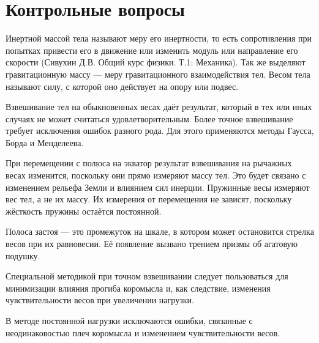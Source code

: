 \section{Контрольные вопросы}

\begin{Enumerate}
	\item Инертной массой тела называют меру его инертности, то есть сопротивления при попытках привести его в движение или изменить модуль или направление его скорости (Сивухин Д.В. Общий курс физики. Т.1: Механика). Так же выделяют гравитационную массу --- меру гравитационного взаимодействия тел. Весом тела называют силу, с которой оно действует на опору или подвес.
	
	\item Взвешивание тел на обыкновенных весах даёт результат, который в тех или иных случаях не может считаться удовлетворительным. Более точное взвешивание требует исключения ошибок разного рода. Для этого применяются методы Гаусса, Борда и Менделеева.
	
	\item При перемещении с полюса на экватор результат взвешивания на рычажных весах изменится, поскольку они прямо измеряют массу тел. Это будет связано с изменением рельефа Земли и влиянием сил инерции. Пружинные весы измеряют вес тел, а не их массу. Их измерения от перемещения не зависят, поскольку жёсткость пружины остаётся постоянной.
	
	\item Полоса застоя --- это промежуток на шкале, в котором может остановится стрелка весов при их равновесии. Её появление вызвано трением призмы об агатовую подушку.
	
	\item Специальной методикой при точном взвешивании следует пользоваться для минимизации влияния прогиба коромысла и, как следствие, изменения чувствительности весов при увеличении нагрузки.
	
	\item В методе постоянной нагрузки исключаются ошибки, связанные с неодинаковостью плеч коромысла и изменением чувствительности весов.
\end{Enumerate}